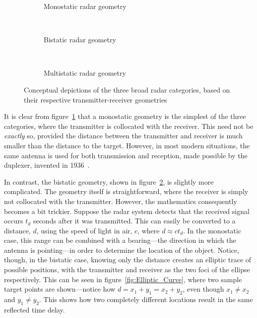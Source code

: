 \documentclass[class=report,11pt,crop=false]{standalone}
\begin{document}
\begin{figure}[htbp]
    \centering
    \begin{subfigure}[t]{0.48\textwidth}
        \centering
        \def\svgwidth{\linewidth}
        { %
            }
        \caption{Monostatic radar geometry}
        \label{fig:Geometry_Monostatic}
    \end{subfigure}%
    ~ 
    \begin{subfigure}[t]{0.48\textwidth}
        \centering
        \def\svgwidth{\linewidth}
        { %
            }
        \caption{Bistatic radar geometry}
        \label{fig:Geometry_Bistatic}
    \end{subfigure}
    ~
    \begin{subfigure}[t]{0.6\textwidth}
        \centering
        \def\svgwidth{\linewidth}
        { %
            }
        \caption{Multistatic radar geometry}
        \label{fig:Geometry_Multistatic}
    \end{subfigure}%
    \caption{Conceptual depictions of the three broad radar categories, based on their respective transmitter-receiver geometries}
    \label{fig:Radar_Geometry_Depictions}
\end{figure}

It is clear from figure~\ref{fig:Geometry_Monostatic} that a monostatic geometry is the simplest of the three categories, where the transmitter is collocated with the receiver. This need not be \emph{exactly} so, provided the distance between the transmitter and receiver is much smaller than the distance to the target. However, in most modern situations, the same antenna is used for both transmission and reception, made possible by the duplexer, invented in 1936~\cite{kuschel-hagan-history}.

In contrast, the bistatic geometry, shown in figure~\ref{fig:Geometry_Bistatic}, is slightly more complicated. The geometry itself is straightforward, where the receiver is simply not collocated with the transmitter. However, the mathematics consequently becomes a bit trickier. Suppose the radar system detects that the received signal occurs \(t_d\) seconds after it was transmitted. This can easily be converted to a distance, \(d\), using the speed of light in air, \(c\), where \(d \approx ct_d\). In the monostatic case, this range can be combined with a bearing---the direction in which the antenna is pointing---in order to determine the location of the object. Notice, though, in the bistatic case, knowing only the distance creates an elliptic trace of possible positions, with the transmitter and receiver as the two foci of the ellipse respectively. This can be seen in figure~\ref{fig:Elliptic_Curve}, where two sample target points are shown---notice how \(d = x_1 + y_1 = x_2 + y_2\), even though \(x_1 \ne x_2\) and \(y_1 \ne y_2\). This shows how two completely different locations result in the same reflected time delay.
\end{document}
